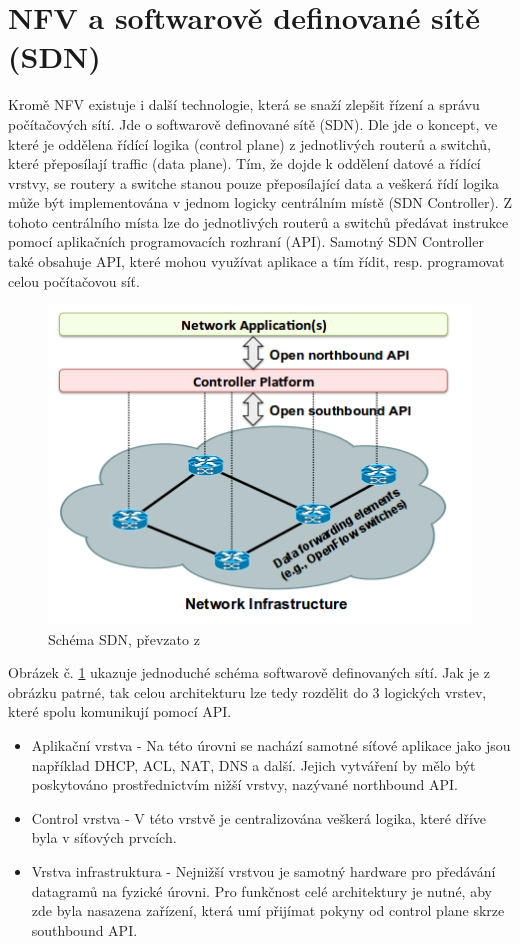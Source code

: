 \section{NFV a softwarově definované sítě (SDN)}

Kromě NFV existuje i další technologie, která se snaží zlepšit řízení a správu počítačových sítí. Jde o softwarově definované sítě (SDN). Dle \cite{SDN_clanek} jde o koncept, ve které je oddělena řídící logika (control plane) z jednotlivých routerů a switchů, které přeposílají traffic (data plane). Tím, že dojde k oddělení datové a řídící vrstvy, se routery a switche stanou pouze přeposílající data a veškerá řídí logika může být implementována v jednom logicky centrálním místě (SDN Controller). Z tohoto centrálního místa lze do jednotlivých routerů a switchů předávat instrukce pomocí aplikačních programovacích rozhraní (API). Samotný SDN Controller také obsahuje API, které mohou využívat aplikace a tím řídit, resp. programovat celou počítačovou síť.

\begin{figure}[h]
\begin{centering}
\includegraphics[scale=0.60]{images/SDN}
\par\end{centering}
\caption{Schéma SDN, převzato z \cite{SDN_clanek}\label{fig:SDN}}
\end{figure}

Obrázek č. \ref{fig:SDN} ukazuje jednoduché schéma softwarově definovaných sítí. Jak je z obrázku patrné, tak celou architekturu lze tedy rozdělit do 3 logických vrstev, které spolu komunikují pomocí API. 

\begin{itemize}
\item Aplikační vrstva - Na této úrovni se nachází samotné síťové aplikace jako jsou například DHCP, ACL, NAT, DNS a další. Jejich vytváření by
mělo být poskytováno prostřednictvím nižší vrstvy, nazývané northbound API.
\item Control vrstva - V této vrstvě je centralizována veškerá logika, které dříve byla v síťových prvcích.
\item Vrstva infrastruktura - Nejnižší vrstvou je samotný hardware pro předávání datagramů na fyzické úrovni. Pro funkčnost celé architektury je nutné, aby zde byla nasazena zařízení, která umí přijímat pokyny od control plane skrze southbound API.
\end{itemize}

